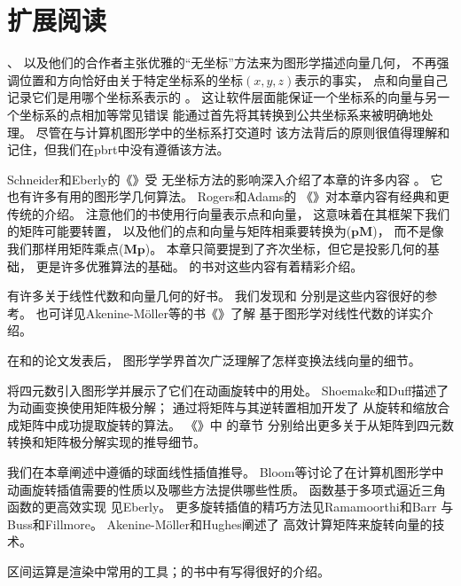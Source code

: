 \section{扩展阅读}\label{sec:扩展阅读02}
\citeauthor{10.1007/978-3-642-61542-9_19}、\citeauthor{10.1145/282957.282969}
以及他们的合作者主张优雅的“无坐标”方法来为图形学描述向量几何，
不再强调位置和方向恰好由关于特定坐标系的坐标$(x,y,z)$表示的事实，
点和向量自己记录它们是用哪个坐标系表示的
\citep{10.1145/282957.282969,10.1007/978-3-642-61542-9_19,Mann97acoordinate}。
这让软件层面能保证一个坐标系的向量与另一个坐标系的点相加等常见错误
能通过首先将其转换到公共坐标系来被明确地处理。
尽管在与计算机图形学中的坐标系打交道时
该方法背后的原则很值得理解和记住，但我们在pbrt中没有遵循该方法。

Schneider和Eberly的《》受
无坐标方法的影响深入介绍了本章的许多内容\citep{10.5555/2821579}
。
它也有许多有用的图形学几何算法。
Rogers和Adams\parencite*{10.5555/63448}的
《》对本章内容有经典和更传统的介绍。
注意他们的书使用行向量表示点和向量，
这意味着在其框架下我们的矩阵可能要转置，
以及他们的点和向量与矩阵相乘要转换为($\bm p\bm M$)，
而不是像我们那样用矩阵乘点($\bm M\bm p$)。
本章只简要提到了齐次坐标，但它是投影几何的基础，
更是许多优雅算法的基础。
\citeauthor{10.5555/113163}的书对这些内容有着精彩介绍\citep{10.5555/113163}。

有许多关于线性代数和向量几何的好书。
我们发现\citet{lang2012introduction}和\citet{buck1956advanced}
分别是这些内容很好的参考。
也可详见Akenine-Möller等的书《》\parencite*{10.5555/2829183}了解
基于图形学对线性代数的详实介绍。

在\citet{inproceedings}和\citet{TURKOWSKI1990539}的论文发表后，
图形学学界首次广泛理解了怎样变换法线向量的细节。

\citet{10.1145/325334.325242}将四元数引入图形学并展示了它们在动画旋转中的用处。
Shoemake和Duff\parencite*{10.5555/155294.155324}描述了为动画变换使用矩阵极分解；
\citet{doi:10.1137/0907079}通过将矩阵与其逆转置相加开发了
从旋转和缩放合成矩阵中成功提取旋转的算法。
《\emph{}》中
\citeauthor{SHOEMAKE1994207}的章节\parencite*{SHOEMAKE1991351,SHOEMAKE1994207,10.5555/180895.180914}
分别给出更多关于从矩阵到四元数转换和矩阵极分解实现的推导细节。

我们在本章阐述中遵循\citet{Blow_2004}的球面线性插值推导。
Bloom等\parencite*{Bloom2003ErrorsAO}讨论了在计算机图形学中
动画旋转插值需要的性质以及哪些方法提供哪些性质。
函数基于多项式逼近三角函数的更高效实现
见Eberly\parencite*{doi:10.1080/2151237X.2011.610255}。
更多旋转插值的精巧方法见Ramamoorthi和Barr\parencite*{10.1145/258734.258870}
与Buss和Fillmore\parencite*{10.1145/502122.502124}。
Akenine-Möller和Hughes\parencite*{doi:10.1080/10867651.1999.10487509}阐述了
高效计算矩阵来旋转向量的技术。

区间运算是渲染中常用的工具；\citet{moore1966interval}的书中有写得很好的介绍。